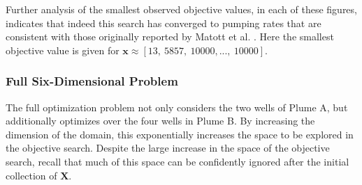 \documentclass[12pt]{article}
\begin{document}
	
	Further analysis of the smallest observed objective values, in each of these figures, indicates that indeed this search has converged to pumping rates that are consistent with those originally reported by Matott et al. \cite{lockCite}. 
	Here the smallest objective value is given for \mbox{$\bm{x} \approx \left[13,~5857,~10000,...,~10000\right]$.}    
	
	\clearpage
	\subsubsection{Full Six-Dimensional Problem}
	
	The full optimization problem not only considers the two wells of Plume A, but additionally optimizes over the four wells in Plume B.
	By increasing the dimension of the domain, this exponentially increases the space to be explored in the objective search.
	Despite the large increase in the space of the objective search, recall that much of this space can be confidently ignored after the initial collection of $\bm{X}$.
\end{document}
